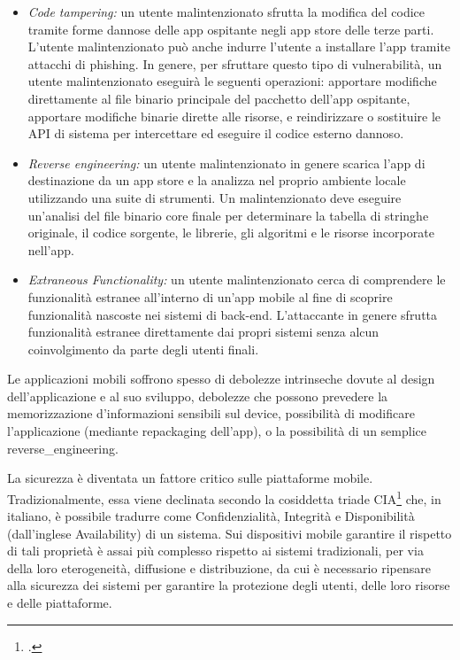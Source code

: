 \begin{itemize}
    \item \textit{Code tampering:}
    un utente malintenzionato sfrutta la modifica del codice tramite forme dannose delle app ospitante negli app store delle terze parti.
    L'utente malintenzionato può anche indurre l'utente a installare l'app tramite attacchi di phishing.
    In genere, per sfruttare questo tipo di vulnerabilità, un utente malintenzionato eseguirà le seguenti operazioni: apportare modifiche direttamente al file binario principale del pacchetto dell’app ospitante, apportare modifiche binarie dirette alle risorse, e reindirizzare o sostituire le API di sistema per intercettare ed eseguire il codice esterno dannoso.

    \item \textit{Reverse engineering:}
    un utente malintenzionato in genere scarica l'app di destinazione da un app store e la analizza nel proprio ambiente locale utilizzando una suite di strumenti.
    Un malintenzionato deve eseguire un'analisi del file binario core finale per determinare la tabella di stringhe originale, il codice sorgente, le librerie, gli algoritmi e le risorse incorporate nell'app.
    \item \textit{Extraneous Functionality:}
    un utente malintenzionato cerca di comprendere le funzionalità estranee all'interno di un'app mobile  al fine di scoprire funzionalità nascoste nei sistemi di back-end.
    L'attaccante in genere sfrutta funzionalità estranee direttamente dai propri sistemi senza alcun coinvolgimento da parte degli utenti finali.
\end{itemize}
Le applicazioni mobili soffrono spesso di debolezze intrinseche dovute al design dell'applicazione e al suo sviluppo, debolezze che possono prevedere la memorizzazione d'informazioni sensibili sul device, possibilità di modificare l'applicazione (mediante \gls{repackaging} dell'app), o la possibilità di un semplice \gls{reverse_engineering}.

La sicurezza è diventata un fattore critico sulle piattaforme mobile.
Tradizionalmente, essa viene declinata secondo la cosiddetta triade CIA\footcite{samonas2014cia} che, in italiano, è possibile tradurre come Confidenzialità, Integrità e Disponibilità (dall'inglese Availability) di un sistema.
Sui dispositivi mobile garantire il rispetto di tali proprietà è assai più complesso rispetto ai sistemi tradizionali, per via della loro eterogeneità, diffusione e distribuzione, da cui è necessario ripensare alla sicurezza dei sistemi per garantire la protezione degli utenti, delle loro risorse e delle piattaforme.

